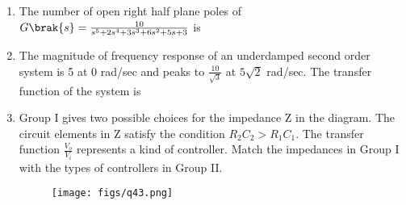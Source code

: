 \documentclass[a4paper, 11pt]{article}
\begin{document}
\begin{enumerate}
    \hfill{}
    
    \item The number of open right half plane poles of $G\brak{s} = \frac{10}{s^5+2s^4+3s^3+6s^2+5s+3}$ is
    \begin{enumerate}
    \end{enumerate}
    
    \hfill{}
    
    \item The magnitude of frequency response of an underdamped second order system is 5 at 0 rad/sec and peaks to $\frac{10}{\sqrt{3}}$ at $5\sqrt{2}$ rad/sec. The transfer function of the system is
    \begin{enumerate}
    \end{enumerate}
    
    \hfill{}

    \item Group I gives two possible choices for the impedance Z in the diagram. The circuit elements in Z satisfy the condition $R_2C_2 > R_1C_1$. The transfer function $\frac{V_o}{V_i}$ represents a kind of controller. Match the impedances in Group I with the types of controllers in Group II.
    \begin{figure}[H]
        \centering
        \texttt{[image: figs/q43.png]}
        \caption*{}
        \label{fig:q43}
    \end{figure}
    

\end{enumerate}
\end{document}
